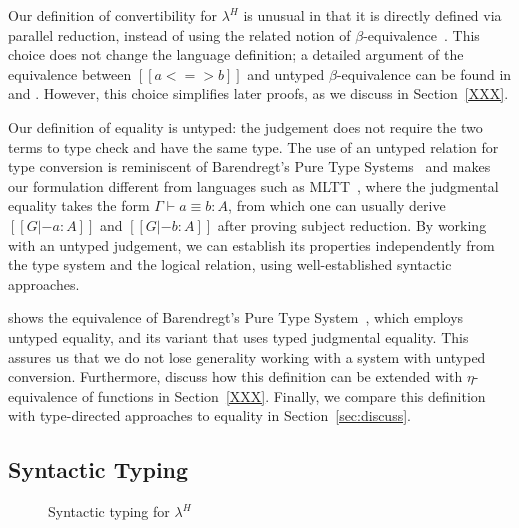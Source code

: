 \documentclass[acmsmall,screen=true,
\ifpublic review=false\else,review=true\fi
  ,anonymous=\ifanonymous true\else false\fi]{acmart}
\newcommand{\lang}{$\lambda^H$\xspace}
\newcommand{\scw}[1]{}
\begin{document}
Our definition of convertibility for \lang{} is unusual in that it is directly
defined via parallel reduction, instead of using the related notion of
$\beta$-equivalence~\cite{barendregt:pts,cic}. This choice does not change the
language definition; a detailed argument of the equivalence between
$[[a <=> b]]$ and untyped $\beta$-equivalence can be found in
\citet{barendregt:lambda-calculi-with-types} and
\citet{takahashi-parallel-reduction}. However, this choice simplifies later
proofs, as we discuss in Section~\ref{XXX}. \scw{Forward reference to further
  discussion, comparing with whnf reduction?}

Our definition of equality is untyped: the judgement does not require the two
terms to type check and have the same type. The use of an untyped relation for
type conversion is reminiscent of Barendregt's Pure Type
Systems~\citet{barendregt1991introduction} and makes our formulation different
from languages such as MLTT~\citep{Martin-Lof-1973}, where the judgmental
equality takes the form $\Gamma \vdash a \equiv b : A$, from which one can
usually derive $[[G |- a : A]]$ and $[[G |- b : A]]$ after proving subject
reduction. By working with an untyped judgement, we can establish its
properties independently from the type system and the logical relation, using
well-established syntactic approaches.

\citet{siles2012pure} shows the equivalence of Barendregt's Pure Type
System~\citep{barendregt1991introduction}, which employs untyped equality, and
its variant that uses typed judgmental equality. This assures us that we do
not lose generality working with a system with untyped
conversion. Furthermore, discuss how this definition can be extended with
$\eta$-equivalence of functions in Section~\ref{XXX}. Finally, we compare this
definition with type-directed approaches to equality in
Section~\ref{sec:discuss}.


\subsection{Syntactic Typing}

\begin{figure}[h]
\begin{minipage}{0.9\textwidth}
\end{minipage}
\caption{Syntactic typing for \lang}
\label{fig:typing}
\end{figure}
\end{document}
